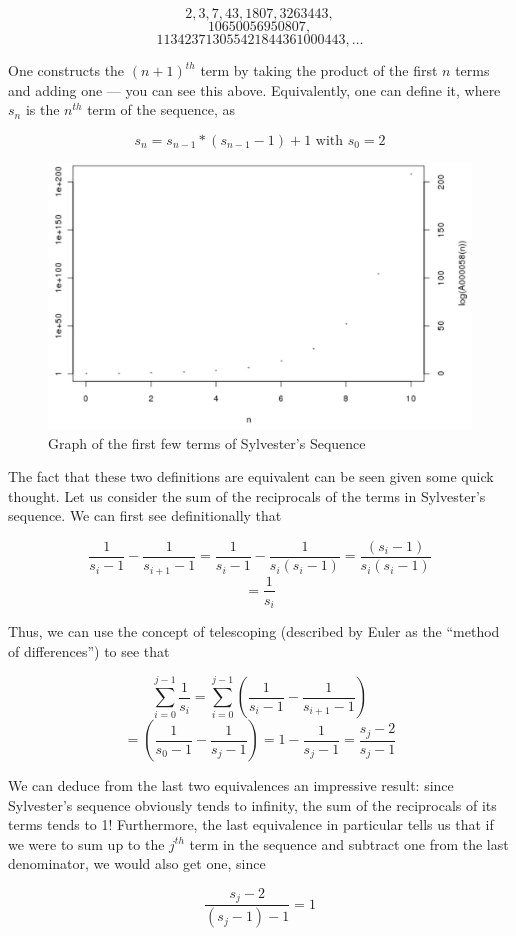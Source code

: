 \[2, 3, 7, 43, 1807, 3263443,\]
\[10650056950807,\]
\[113423713055421844361000443, \ldots\]

One constructs the \((n+1)^{th}\) term by taking the product of the first \(n\) terms and adding one --- you can see this above. Equivalently, one can define it, where \(s_n\) is the \(n^{th}\) term of the sequence, as\par

\[s_n = s_{n-1}*(s_{n-1}-1)+1 \textrm{ with } s_0 = 2\]

\begin{figure}[h!]
\caption{Graph of the first few terms of Sylvester's Sequence}
\centering
\includegraphics{Sylvester.JPG}
\end{figure}

The fact that these two definitions are equivalent can be seen given some quick thought. Let us consider the sum of the reciprocals of the terms in Sylvester’s sequence. We can first see definitionally that\par

\[\frac{1}{s_i-1}-\frac{1}{s_{i+1}-1} = \frac{1}{s_i-1}-\frac{1}{s_i(s_i-1)} = \frac{(s_i-1)}{s_i(s_i-1)}\]
\[ = \frac{1}{s_i}\]

Thus, we can use the concept of telescoping (described by Euler as the “method of differences”) to see that\par

\[\sum^{j-1}_{i=0} \frac{1}{s_i} = \sum^{j-1}_{i=0} (\frac{1}{s_i-1} -\frac{1}{s_{i+1}-1})\]
\[ = (\frac{1}{s_0-1} -\frac{1}{s_{j}-1}) = 1 - \frac{1}{s_{j}-1} = \frac{s_j-2}{s_{j}-1} \]

We can deduce from the last two equivalences an impressive result: since Sylvester’s sequence obviously tends to infinity, the sum of the reciprocals of its terms tends to 1! Furthermore, the last equivalence in particular tells us that if we were to sum up to the \(j^{th}\) term in the sequence and subtract one from the last denominator, we would also get one, since\par
\[ \frac{s_j-2}{(s_{j}-1)-1} = 1\]

